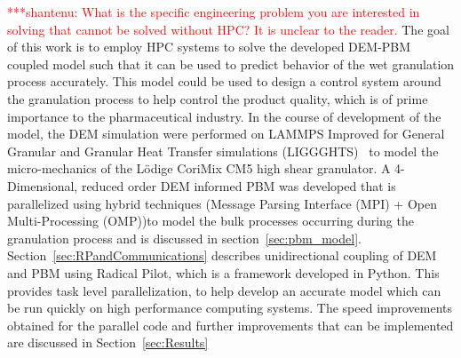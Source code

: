 \documentclass[preprint,11pt,authoryear]{elsarticle}
\newcommand{\jhanote}[1]{ {\textcolor{red} { ***shantenu: #1 }}}
\newcommand{\jhanote}[1]{}
\begin{document}



\jhanote{What is the specific engineering problem you are interested in
solving that cannot be solved without HPC? It is unclear to the reader.} 
The goal of this work is to employ HPC systems to solve the developed DEM-PBM coupled 
model such that it can be used to predict behavior of the wet granulation 
process accurately. This model could be used to design a control system 
around the granulation process to help control the product quality, which is of 
prime importance to the pharmaceutical industry. In the course of
development of the model, the DEM simulation were performed on LAMMPS Improved
for General Granular and Granular Heat Transfer simulations
(LIGGGHTS)~\citep{Kloss2012} to model the micro-mechanics of the L\"{o}dige
CoriMix CM5 high shear granulator. A 4-Dimensional, reduced order DEM informed
PBM was developed that is parallelized using hybrid techniques (Message
Parsing Interface (MPI) + Open Multi-Processing (OMP))to model the bulk
processes occurring during the granulation process and is discussed in
section~\ref{sec:pbm_model}. Section~\ref{sec:RPandCommunications} describes
unidirectional coupling of DEM and PBM using Radical Pilot, which is a
framework developed in Python. This provides task level parallelization, to
help develop an accurate model which can be run quickly on high performance
computing systems. The speed improvements obtained for the parallel code and
further improvements that can be implemented are discussed in
Section~\ref{sec:Results}
\end{document}
